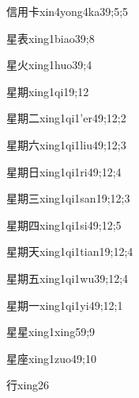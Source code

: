 \begin{verbete}{信用卡}{xin4yong4ka3}{9;5;5}
\end{verbete}
\begin{verbete}{星表}{xing1biao3}{9;8}
\end{verbete}
\begin{verbete}{星火}{xing1huo3}{9;4}
\end{verbete}
\begin{verbete}{星期}{xing1qi1}{9;12}
\end{verbete}
\begin{verbete}{星期二}{xing1qi1'er4}{9;12;2}
\end{verbete}
\begin{verbete}{星期六}{xing1qi1liu4}{9;12;3}
\end{verbete}
\begin{verbete}{星期日}{xing1qi1ri4}{9;12;4}
\end{verbete}
\begin{verbete}{星期三}{xing1qi1san1}{9;12;3}
\end{verbete}
\begin{verbete}{星期四}{xing1qi1si4}{9;12;5}
\end{verbete}
\begin{verbete}{星期天}{xing1qi1tian1}{9;12;4}
\end{verbete}
\begin{verbete}{星期五}{xing1qi1wu3}{9;12;4}
\end{verbete}
\begin{verbete}{星期一}{xing1qi1yi4}{9;12;1}
\end{verbete}
\begin{verbete}{星星}{xing1xing5}{9;9}
\end{verbete}
\begin{verbete}{星座}{xing1zuo4}{9;10}
\end{verbete}
\begin{verbete}{行}{xing2}{6}
\end{verbete}
